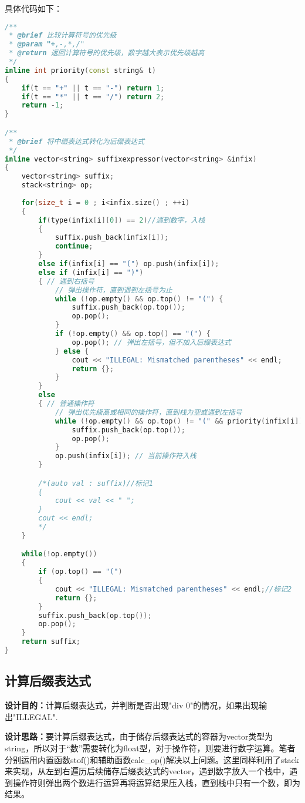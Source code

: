 \documentclass[fontset=fandol]{ctexart}
\begin{document}
具体代码如下：
\begin{lstlisting}[language=C++, caption={priority() \& suffixexpressor()}]
/**
 * @brief 比较计算符号的优先级
 * @param "+,-,*,/"
 * @return 返回计算符号的优先级，数字越大表示优先级越高
 */
inline int priority(const string& t)
{
    if(t == "+" || t == "-") return 1;
    if(t == "*" || t == "/") return 2;
    return -1;
}

/**
 * @brief 将中缀表达式转化为后缀表达式
 */
inline vector<string> suffixexpressor(vector<string> &infix)
{
    vector<string> suffix;
    stack<string> op;
    
    for(size_t i = 0 ; i<infix.size() ; ++i)
    {
        if(type(infix[i][0]) == 2)//遇到数字，入栈
        {
            suffix.push_back(infix[i]);
            continue;
        }
        else if(infix[i] == "(") op.push(infix[i]);
        else if (infix[i] == ")") 
        { // 遇到右括号
            // 弹出操作符，直到遇到左括号为止
            while (!op.empty() && op.top() != "(") {
                suffix.push_back(op.top());
                op.pop();
            }
            if (!op.empty() && op.top() == "(") {
                op.pop(); // 弹出左括号，但不加入后缀表达式
            } else {
                cout << "ILLEGAL: Mismatched parentheses" << endl;
                return {};
            }
        } 
        else 
        { // 普通操作符
            // 弹出优先级高或相同的操作符，直到栈为空或遇到左括号
            while (!op.empty() && op.top() != "(" && priority(infix[i]) <= priority(op.top())) {
                suffix.push_back(op.top());
                op.pop();
            }
            op.push(infix[i]); // 当前操作符入栈
        }

        /*(auto val : suffix)//标记1
        {
            cout << val << " ";
        }
        cout << endl;
        */
    }

    while(!op.empty())
    {
        if (op.top() == "(") 
        {
            cout << "ILLEGAL: Mismatched parentheses" << endl;//标记2
            return {};
        }
        suffix.push_back(op.top());
        op.pop();
    }
    return suffix;
}  
\end{lstlisting}
\subsection{计算后缀表达式}
\textbf{设计目的：}计算后缀表达式，并判断是否出现"div 0"的情况，如果出现输出"ILLEGAL".

\textbf{设计思路：}要计算后缀表达式，由于储存后缀表达式的容器为vector类型为string，所以对于“数”需要转化为float型，对于操作符，则要进行数字运算。笔者分别运用内置函数stof()和辅助函数calc\_op()解决以上问题。这里同样利用了stack来实现，从左到右遍历后续储存后缀表达式的vector，遇到数字放入一个栈中，遇到操作符则弹出两个数进行运算再将运算结果压入栈，直到栈中只有一个数，即为结果。
\end{document}
